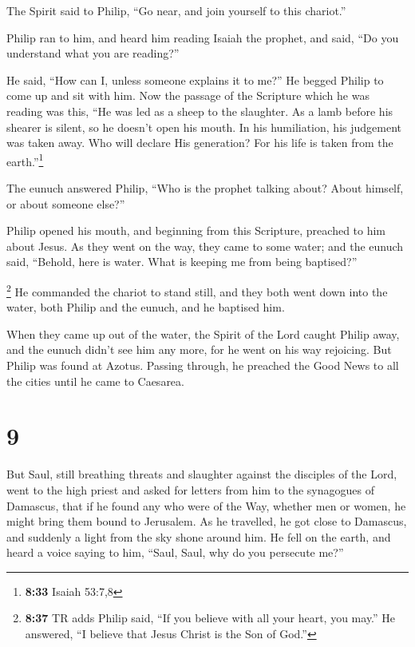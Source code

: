  The Spirit said to Philip, ``Go near, and join yourself
to this chariot.''

 Philip ran to him, and heard him reading Isaiah the
prophet, and said, ``Do you understand what you are reading?''

 He said, ``How can I, unless someone explains it to
me?'' He begged Philip to come up and sit with him.  Now
the passage of the Scripture which he was reading was this, ``He was led
as a sheep to the slaughter. As a lamb before his shearer is silent, so
he doesn't open his mouth.  In his humiliation, his
judgement was taken away. Who will declare His generation? For his life
is taken from the earth.''\footnote{\textbf{8:33} Isaiah 53:7,8}

 The eunuch answered Philip, ``Who is the prophet talking
about? About himself, or about someone else?''

 Philip opened his mouth, and beginning from this
Scripture, preached to him about Jesus.  As they went on
the way, they came to some water; and the eunuch said, ``Behold, here is
water. What is keeping me from being baptised?''

 \footnote{\textbf{8:37} TR adds Philip said, ``If you
  believe with all your heart, you may.'' He answered, ``I believe that
  Jesus Christ is the Son of God.''}  He commanded the
chariot to stand still, and they both went down into the water, both
Philip and the eunuch, and he baptised him.

 When they came up out of the water, the Spirit of the
Lord caught Philip away, and the eunuch didn't see him any more, for he
went on his way rejoicing.  But Philip was found at
Azotus. Passing through, he preached the Good News to all the cities
until he came to Caesarea.

\hypertarget{section-8}{%
\section{9}\label{section-8}}

 But Saul, still breathing threats and slaughter against
the disciples of the Lord, went to the high priest  and
asked for letters from him to the synagogues of Damascus, that if he
found any who were of the Way, whether men or women, he might bring them
bound to Jerusalem.  As he travelled, he got close to
Damascus, and suddenly a light from the sky shone around him.
 He fell on the earth, and heard a voice saying to him,
``Saul, Saul, why do you persecute me?''

